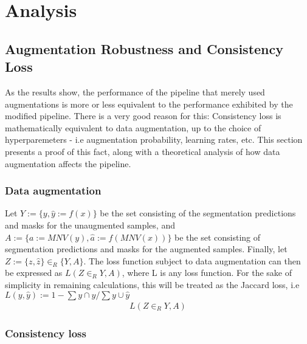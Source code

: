 \chapter{Analysis}\label{analysis}
\section{Augmentation Robustness and Consistency Loss}
As the results show, the performance of the pipeline that merely used augmentations is more or less equivalent to the performance exhibited by the modified pipeline. There is a very good reason for this: Consistency loss is mathematically equivalent to data augmentation, up to the choice of hyperparemeters - i.e augmentation probability, learning rates, etc. This section presents a proof of this fact, along with a theoretical analysis of how data augmentation affects the pipeline. 
\subsection{Data augmentation}
Let \(Y:=\{y,\hat{y}:=f(x)\}\) be the set consisting of the segmentation predictions and masks for the unaugmented samples, and \(A:=\{a:=MNV(y),\hat{a}:=f(MNV(x))\}\) be the set consisting of segmentation predictions and masks for the augmented samples. Finally, let \(Z:=\{z, \hat{z}\} \in_R \{Y, A\} \). The loss function subject to data augmentation can then be expressed as \(L(Z \in_R Y,A)\), where L is any loss function. For the sake of simplicity in remaining calculations, this will be treated as the Jaccard loss, i.e \(L(y,\hat{y}):=1-\sum y\cap \hat{y} / \sum y \cup \hat{y}\) 
\begin{align*}
L(Z \in_R Y,A)  
\end{align*}
\subsection{Consistency loss}

